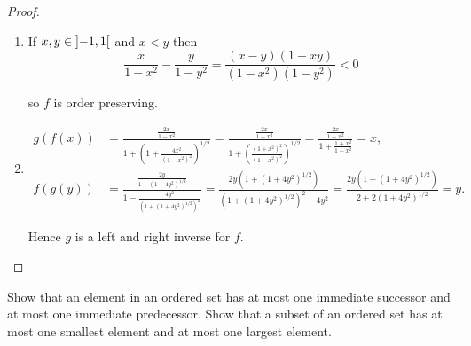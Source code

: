 \begin{proof}
    \begin{enumerate}[label={(\alph*)}]
        \item If $x, y\in \left]{-1, 1}\right[$ and $x < y$ then
              \[
                  \frac{x}{1-x^{2}} - \frac{y}{1-y^{2}} = \frac{(x - y)(1 + xy)}{(1 - x^{2})(1 - y^{2})} < 0
              \]

              so $f$ is order preserving.
        \item \begin{align*}
                  g(f(x)) & = \frac{\frac{2x}{1-x^{2}}}{1 + {\left(1 + \frac{4x^{2}}{{(1-x^{2})}^{2}}\right)}^{1/2}} = \frac{\frac{2x}{1-x^{2}}}{1 + {\left(\frac{{(1+x^{2})}^{2}}{{(1-x^{2})}^{2}}\right)}^{1/2}} = \frac{\frac{2x}{1-x^{2}}}{1 + \frac{1+x^{2}}{1-x^{2}}} = x,                                      \\
                  f(g(y)) & = \frac{\frac{2y}{1 + {\left(1 + 4y^{2}\right)}^{1/2}}}{1 - \frac{4y^{2}}{{\left(1 + {\left(1 + 4y^{2}\right)}^{1/2}\right)}^{2}}} = \frac{2y(1 + {(1 + 4y^{2})}^{1/2})}{{(1 + {(1 + 4y^{2})}^{1/2})}^{2} - 4y^{2}} = \frac{2y(1 + {(1 + 4y^{2})}^{1/2})}{2 + 2{(1 + 4y^{2})}^{1/2}} = y.
              \end{align*}

              Hence $g$ is a left and right inverse for $f$.
    \end{enumerate}
\end{proof}

\begin{exercise}\label{chapter1:section3:exercise11}
    Show that an element in an ordered set has at most one immediate successor and at most one immediate predecessor. Show that a subset of an ordered set has at most one smallest element and at most one largest element.
\end{exercise}

